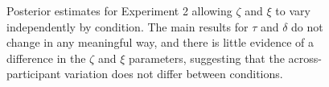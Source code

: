 \documentclass[doc,biblatex]{apa7}
\begin{document}
\begin{figure}
\vspace*{2pt}
\caption{Posterior estimates for Experiment 2 allowing $\zeta$ and $\xi$ to vary independently by condition. The main results for $\tau$ and $\delta$ do not change in any meaningful way, and there is little evidence of a difference in the $\zeta$ and $\xi$ parameters, suggesting that the across-participant variation does not differ between conditions.}
\label{supp4}
\end{figure}
\end{document}
